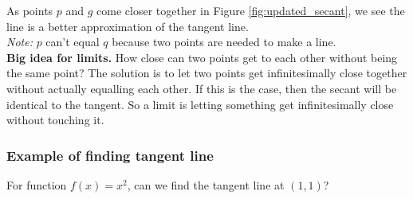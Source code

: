 \documentclass{article}
\begin{document}
As points $p$ and $g$ come closer together in Figure \ref{fig:updated_secant}, we see the
line is a better approximation of the tangent line.\\

\emph{Note:} $p$ can't equal $q$ because two points are needed to make a line.\\

\textbf{Big idea for limits.} How close can two points get to each other without being the
same point? The solution is to let two points get infinitesimally close together without actually
equalling each other. If this is the case, then the secant will be identical to the
tangent. So a limit is letting something get infinitesimally close without touching it.

\subsubsection{Example of finding tangent line}

For function $f(x) = x^2$, can we find the tangent line at $(1, 1)$? 
\end{document}
